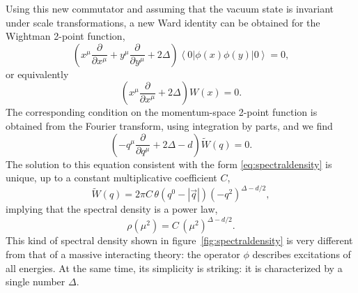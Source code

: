 \documentclass[a4paper,12pt]{article}
\newcommand{\ket}[1]{\left| #1 \right\rangle}
\newcommand{\bra}[1]{\left\langle #1 \right|}
\numberwithin{equation}{section}
\begin{document}
Using this new commutator and assuming that the vacuum state is invariant under scale transformations, a new Ward identity can be obtained for the Wightman 2-point function,
\begin{equation}
	\left( x^\mu \frac{\partial}{\partial x^\mu} 
	+ y^\mu \frac{\partial}{\partial y^\mu}  + 2\Delta \right)
	\bra{0} \phi(x) \phi(y) \ket{0} = 0,
\end{equation}
or equivalently
\begin{equation}
	\left( x^\mu \frac{\partial}{\partial x^\mu} + 2 \Delta \right) 
	W(x) = 0. 
\end{equation}
The corresponding condition on the momentum-space 2-point function
is obtained from the Fourier transform, using integration by parts, and we find
\begin{equation}
	\left( -q^\mu \frac{\partial}{\partial q^\mu} + 2 \Delta - d \right)
	\widetilde{W}(q) = 0. 
	\label{eq:2ptWardIdentity:scale}
\end{equation}
The solution to this equation consistent with the form \eqref{eq:spectraldensity} is unique, up to a constant multiplicative coefficient $C$,
\begin{equation}
	\widetilde{W}(q)
	= 2\pi C \, \theta\left( q^0 - \left| \vec{q} \right| \right)
	(-q^2)^{\Delta - d/2},
\end{equation}
implying that the spectral density is a power law,
\begin{equation}
	\rho(\mu^2) = C \, (\mu^2)^{\Delta - d/2}.
\end{equation}
This kind of spectral density shown in figure~\ref{fig:spectraldensity} is very different from that of a massive interacting theory: the operator $\phi$ describes excitations of all energies.
At the same time, its simplicity is striking: it is characterized by a single number $\Delta$.
\end{document}
